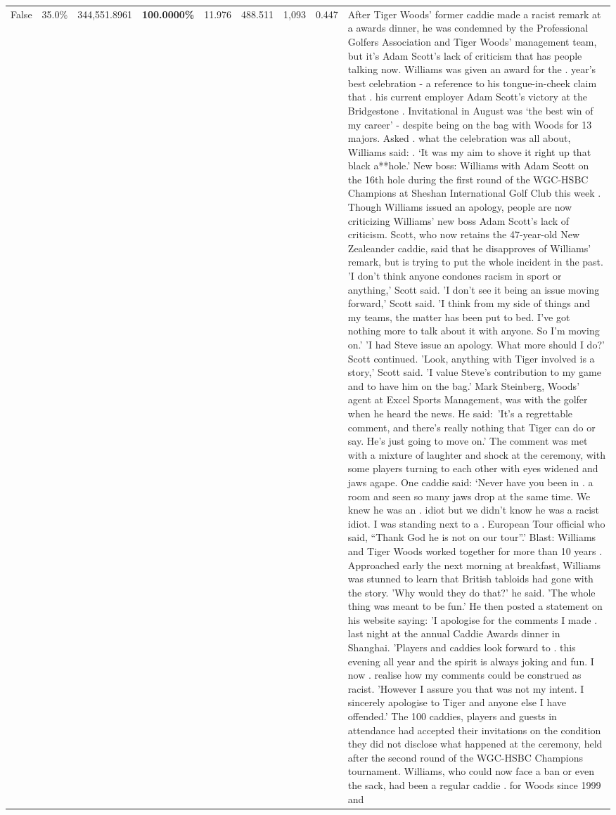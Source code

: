\begin{table}[H]
\begin{tabular}{lllrlllll}
False & 35.0\% & 344,551.8961 & \bfseries \color{red} 100.0000\% & 11.976 & 488.511 & 1,093 & 0.447 & After Tiger Woods' former caddie made a racist remark at a awards dinner, he was condemned by the Professional Golfers Association and Tiger Woods' management team, but it's Adam Scott's lack of criticism that has people talking now. Williams was given an award for the . year’s best celebration - a reference to his tongue-in-cheek claim that . his current employer Adam Scott’s victory at the Bridgestone . Invitational in August was ‘the best win of my career’ - despite being on the bag with Woods for 13 majors. Asked . what the celebration was all about, Williams said: . ‘It was my aim to shove it right up that black a**hole.’ New boss: Williams with Adam Scott  on the 16th hole during the first round of the WGC-HSBC Champions at Sheshan International Golf Club this week . Though Williams issued an apology, people are now criticizing Williams' new boss Adam Scott's lack of criticism. Scott, who now retains the 47-year-old New Zealeander caddie, said that he disapproves of Williams' remark, but is trying to put the whole incident in the past. 'I don't think anyone condones racism in sport or anything,' Scott said. 'I don't see it being an issue moving forward,' Scott said. 'I think from my side of things and my teams, the matter has been put to bed. I've got nothing more to talk about it with anyone. So I'm moving on.' 'I had Steve issue an apology. What more should I do?' Scott continued. 'Look, anything with Tiger involved is a story,' Scott said. 'I value Steve's contribution to my game and to have him on the bag.' Mark Steinberg, Woods' agent at Excel Sports Management, was with the golfer when he heard the news. He said: 'It's a regrettable comment, and there's really nothing that Tiger can do or say. He's just going to move on.' The comment was met with a mixture of laughter and shock at the ceremony, with some players turning to each other with eyes widened and jaws agape. One caddie said: ‘Never have you been in . a room and seen so many jaws drop at the same time. We knew he was an . idiot but we didn’t know he was a racist idiot. I was standing next to a . European Tour official who said, “Thank God he is not on our tour”.’ Blast: Williams and Tiger Woods worked together for more than 10 years . Approached early the next morning at breakfast, Williams was stunned to learn that British tabloids had gone with the story. 'Why would they do that?' he said. 'The whole thing was meant to be fun.' He then posted a statement on his website saying: 'I apologise for the comments I made . last night at the annual Caddie Awards dinner in Shanghai. 'Players and caddies look forward to . this evening all year and the spirit is always joking and fun. I now . realise how my comments could be construed as racist. 'However I assure you that was not my intent. I sincerely apologise to Tiger and anyone else I have offended.' The 100 caddies, players and guests in attendance had accepted their invitations on the condition they did not disclose what happened at the ceremony, held after the second round of the WGC-HSBC Champions tournament. Williams, who could now face a ban or even the sack, had been a regular caddie . for Woods since 1999 and 
\end{tabular}
\end{table}
